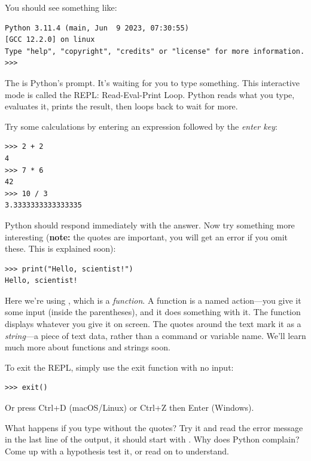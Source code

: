 You should see something like:

\begin{lstlisting}[style=outputstyle]
Python 3.11.4 (main, Jun  9 2023, 07:30:55)
[GCC 12.2.0] on linux
Type "help", "copyright", "credits" or "license" for more information.
>>>
\end{lstlisting}

The \py{>>>} is Python's prompt. It's waiting for you to type something. This interactive mode is called the REPL: Read-Eval-Print Loop. Python reads what you type, evaluates it, prints the result, then loops back to wait for more.

Try some calculations by entering an expression followed by the \emph{enter key}:

\begin{lstlisting}
>>> 2 + 2
4
>>> 7 * 6
42
>>> 10 / 3
3.3333333333333335
\end{lstlisting}

Python should respond immediately with the answer. Now try something more interesting (\textbf{note:} the quotes are important, you will get an error if you omit these. This is explained soon):

\begin{lstlisting}
>>> print("Hello, scientist!")
Hello, scientist!
\end{lstlisting}

Here we're using , which is a \emph{function}. A function is a named action---you give it some input (inside the parentheses), and it does something with it. The  function displays whatever you give it on screen. The quotes around the text mark it as a \emph{string}---a piece of text data, rather than a command or variable name. We'll learn much more about functions and strings soon.

To exit the REPL, simply use the exit function with no input:

\begin{lstlisting}
>>> exit()
\end{lstlisting}

Or press Ctrl+D (macOS/Linux) or Ctrl+Z then Enter (Windows).

\begin{ponder}
What happens if you type  without the quotes? Try it and read the error message in the last line of the output, it should start with . Why does Python complain? Come up with a hypothesis test it, or read on to understand.
\end{ponder}

